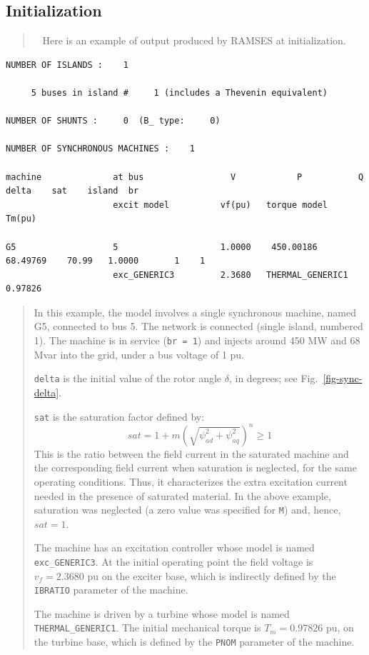 \subsection{Initialization}

\begin{quote}
\faHandPointRight ~ Here is an example of output produced by RAMSES at initialization.
\end{quote}
{\scriptsize
\begin{verbatim}
NUMBER OF ISLANDS :    1

     5 buses in island #     1 (includes a Thevenin equivalent)

NUMBER OF SHUNTS :     0  (B_ type:     0)

NUMBER OF SYNCHRONOUS MACHINES :    1

machine              at bus                 V            P           Q        delta    sat    island  br
                     excit model          vf(pu)   torque model               Tm(pu)

G5                   5                    1.0000    450.00186     68.49769    70.99   1.0000       1    1
                     exc_GENERIC3         2.3680   THERMAL_GENERIC1          0.97826
\end{verbatim}
}
\begin{quote}
In this example, the model involves a single synchronous machine, named G5, connected to bus 5. The network is connected (single island, numbered 1). The machine is in service ({\tt br = 1}) and injects around 450 MW and 68 Mvar into the grid, under a bus voltage of 1 pu.

{\tt delta} is the initial value of the rotor angle $\delta$, in degrees; see Fig.~\ref{fig-sync-delta}.

{\tt sat} is the saturation factor defined by:
\begin{equation}\label{sat-factor}
sat = 1 + m \left( \sqrt{\psi_{ad}^2 + \psi_{aq}^2} \right)^n \geq 1
\end{equation}
This is the ratio between the field current in the saturated machine and the corresponding field current when saturation is neglected, for the same operating conditions. Thus, it characterizes the extra excitation current needed in the presence of saturated material. In the above example, saturation was neglected (a zero value was specified for {\tt M}) and, hence, $sat = 1$.

The machine has an excitation controller whose model is named {\tt exc\_GENERIC3}. At the initial operating point the field voltage is $v_f = 2.3680$ pu on the exciter base, which is indirectly defined by the {\tt IBRATIO} parameter of the machine.

The machine is driven by a turbine whose model is named {\tt THERMAL\_GENERIC1}. The initial mechanical torque is $T_m = 0.97826$ pu, on the turbine base, which is defined by the {\tt PNOM} parameter of the machine.
\end{quote}

